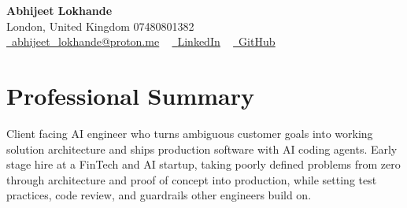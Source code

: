 \documentclass[a4paper,10pt]{article}
\begin{document}
    \begin{center}
        {\Huge\bfseries Abhijeet Lokhande}
        \\[2pt] {\color{muted}London, United Kingdom \textbar{} 07480801382}\\
        \small
        \href{mailto:abhijeet_lokhande@proton.me}{\raisebox{-0.2\height}{\color{primary}\faEnvelope}\  \underline{abhijeet\_lokhande@proton.me}} ~
        \href{https://www.linkedin.com/in/ablds/}{\raisebox{-0.2\height}{\color{primary}\faLinkedin}\ \underline{LinkedIn}}  ~
        \href{https://github.com/abhijeetscode}{\raisebox{-0.2\height}{\color{primary}\faGithub}\ \underline{GitHub}}
    \end{center}

\section{Professional Summary}
\vspace{-5pt}
{\color{muted}Client facing AI engineer who turns ambiguous customer goals into working solution architecture and ships production software with AI coding agents. Early stage hire at a FinTech and AI startup, taking poorly defined problems from zero through architecture and proof of concept into production, while setting test practices, code review, and guardrails other engineers build on.}
\vspace{2pt}

\end{document}
